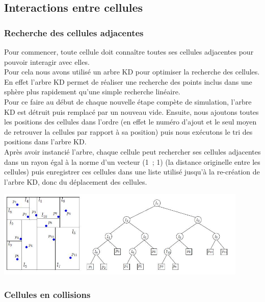 \documentclass[a4paper,11pt]{article}
\begin{document}
\subsection{Interactions entre cellules}

\subsubsection{Recherche des cellules adjacentes}

Pour commencer, toute cellule doit connaître toutes ses cellules adjacentes pour pouvoir interagir avec elles.\\
Pour cela nous avons utilisé un arbre KD pour optimiser la recherche des cellules. En effet l'arbre KD permet de réaliser une recherche des points inclus dans une sphère plus rapidement qu'une simple recherche linéaire.\\
Pour ce faire au début de chaque nouvelle étape compète de simulation, l'arbre KD est détruit puis remplacé par un nouveau vide. Ensuite, nous ajoutons toutes les positions des cellules dans l'ordre (en effet le numéro d'ajout et le seul moyen de retrouver la cellules par rapport à sa position) puis nous exécutons le tri des positions dans l'arbre KD.\\
Après avoir instancié l'arbre, chaque cellule peut rechercher ses cellules adjacentes dans un rayon égal à la norme d'un vecteur (1~; 1) (la distance originelle entre les cellules) puis enregistrer ces cellules dans une liste utilisé jusqu'à la re-création de l'arbre KD, donc du déplacement des cellules.

\begin{center}
  \includegraphics[width=12cm]{Images/kd_tree.jpg}
\end{center}


\subsubsection{Cellules en collisions}
\end{document}

